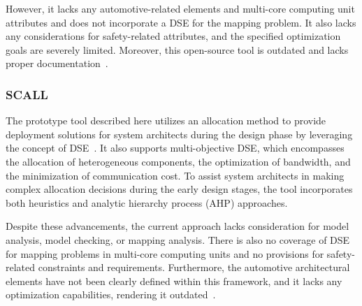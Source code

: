
However, it lacks any automotive-related elements and multi-core computing unit attributes and does not incorporate a DSE for the mapping problem. It also lacks any considerations for safety-related attributes, and the specified optimization goals are severely limited. Moreover, this open-source tool is outdated and lacks proper documentation~\cite{askaripoor2022architecture}.

\subsubsection{SCALL} 
The prototype tool described here utilizes an allocation method to provide deployment solutions for system architects during the design phase by leveraging the concept of DSE~\cite{vsvogor2015scall}. It also supports multi-objective DSE, which encompasses the allocation of heterogeneous components, the optimization of bandwidth, and the minimization of communication cost. To assist system architects in making complex allocation decisions during the early design stages, the tool incorporates both heuristics and analytic hierarchy process (AHP) approaches.

Despite these advancements, the current approach lacks consideration for model analysis, model checking, or mapping analysis. There is also no coverage of DSE for mapping problems in multi-core computing units and no provisions for safety-related constraints and requirements. Furthermore, the automotive architectural elements have not been clearly defined within this framework, and it lacks any optimization capabilities, rendering it outdated~\cite{askaripoor2022architecture}.


